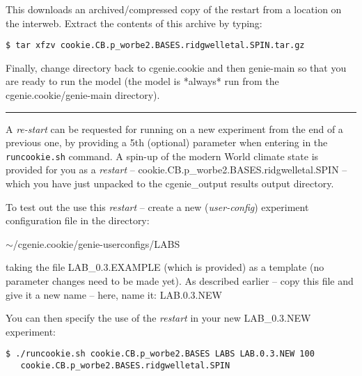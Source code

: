This downloads an archived/compressed copy of the restart from a location on the interweb. Extract the contents of this archive by typing:

\vspace{-2mm}\small
\begin{verbatim}
$ tar xfzv cookie.CB.p_worbe2.BASES.ridgwelletal.SPIN.tar.gz
\end{verbatim}\normalsize
\vspace{-2mm}

Finally, change directory back to \textsf{\footnotesize cgenie.cookie} and then \textsf{\footnotesize genie-main} so that you are ready to run the model (the model is *always* run from the \textsf{\footnotesize cgenie.cookie/genie-main} directory).

\vspace{1mm}
\noindent\rule{4cm}{0.1mm}
\vspace{2mm}

\noindent A \textit{re-start} can be requested for  running on a new experiment from the end of a previous one, by providing a 5th (optional) parameter when entering in the \texttt{runcookie.sh} command. A spin-up of the modern World climate state is provided for you as a \textit{restart} -- 
\textsf{\footnotesize cookie.CB.p\_worbe2.BASES.ridgwelletal.SPIN} -- which you have just unpacked to the \textsf{\footnotesize cgenie\_output} results output directory.

To test out the use this \textit{restart} -- create a new (\textit{user-config}) experiment configuration file in the directory: 

\vspace{1mm}
\textsf{\footnotesize \(\sim\)/cgenie.cookie/genie-userconfigs/LABS}
\vspace{1mm}

\noindent taking the file \textsf{\footnotesize LAB\_0.3.EXAMPLE} (which is provided) as a template (no parameter changes need to be made yet). As described earlier -- copy this file and give it a new name -- here, name it: \textsf{\footnotesize LAB.0.3.NEW}

\newpage

\noindent You can then specify the use of the \textit{restart} in your new \textsf{\footnotesize LAB\_0.3.NEW} experiment:

\vspace{-2mm}
\small\begin{verbatim}
$ ./runcookie.sh cookie.CB.p_worbe2.BASES LABS LAB.0.3.NEW 100 
   cookie.CB.p_worbe2.BASES.ridgwelletal.SPIN
\end{verbatim}\normalsize
\vspace{-2mm}

